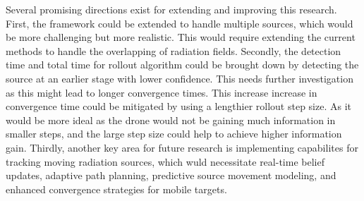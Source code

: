 \documentclass[../report.tex]{subfiles}
\begin{document}
    Several promising directions exist for extending and improving this research. First, the framework could be extended to handle multiple sources, which would be 
    more challenging but more realistic. This would require extending the current methods to handle the overlapping of radiation fields. Secondly, the detection time 
    and total time for rollout algorithm could be brought down by detecting the source at an earlier stage with lower confidence. This needs further investigation as
    this might lead to longer convergence times. This increase increase in convergence time could be mitigated by using a lengthier rollout step size. As it would be more 
    ideal as the drone would not be gaining much information in smaller steps, and the large step size could help to achieve higher information gain. Thirdly,
    another key area for future research is implementing capabilites for tracking moving radiation sources, which wuld necessitate real-time belief updates, 
    adaptive path planning, predictive source movement modeling, and enhanced convergence strategies for mobile targets.
\end{document}
